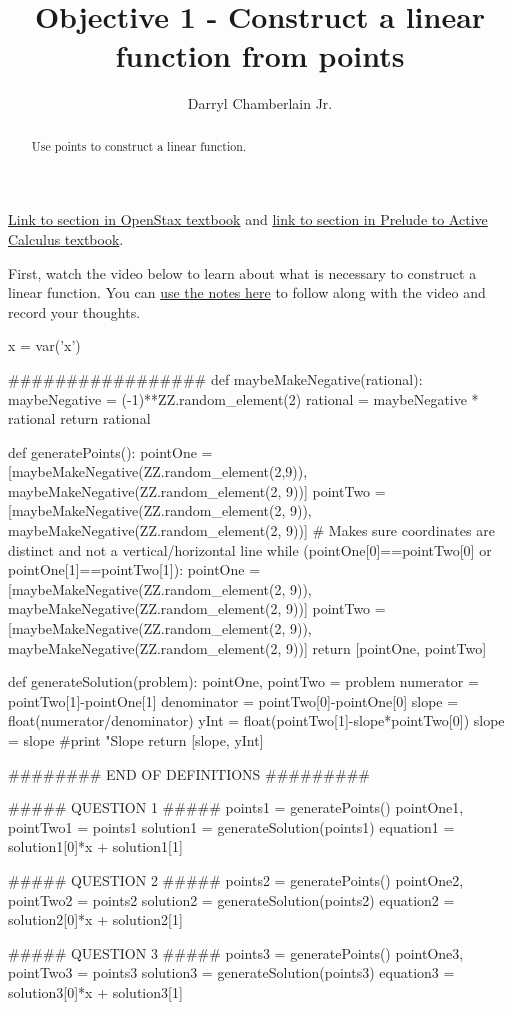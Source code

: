 \documentclass{ximera}
\author{Darryl Chamberlain Jr.}
\title{Objective 1 - Construct a linear function from points}
\begin{document}
\begin{abstract}
Use points to construct a linear function. 
\end{abstract}
\maketitle

\href{https://cnx.org/contents/mwjClAV_@8.1:62_eXnY6@14/Linear-Equations-in-One-Variable}{Link to section in OpenStax textbook} and 
\href{https://activecalculus.org/prelude/sec-changing-linear.html}{link to section in Prelude to Active Calculus textbook}. 


First, watch the video below to learn about what is necessary to construct a linear function. You can \href{http://people.clas.ufl.edu/dchamberlain31/files/Objective-1-Constructing-Linear-Functions.pdf}{use the notes here} to follow along with the video and record your thoughts.


\begin{sagesilent}
x = var('x')

#################
def maybeMakeNegative(rational):
    maybeNegative = (-1)**ZZ.random_element(2)
    rational = maybeNegative * rational
    return rational

def generatePoints():
    pointOne = [maybeMakeNegative(ZZ.random_element(2,9)), maybeMakeNegative(ZZ.random_element(2, 9))]
    pointTwo = [maybeMakeNegative(ZZ.random_element(2, 9)), maybeMakeNegative(ZZ.random_element(2, 9))]
    # Makes sure coordinates are distinct and not a vertical/horizontal line
    while (pointOne[0]==pointTwo[0] or pointOne[1]==pointTwo[1]):
        pointOne = [maybeMakeNegative(ZZ.random_element(2, 9)), maybeMakeNegative(ZZ.random_element(2, 9))]
        pointTwo = [maybeMakeNegative(ZZ.random_element(2, 9)), maybeMakeNegative(ZZ.random_element(2, 9))]
    return [pointOne, pointTwo]

def generateSolution(problem):
    pointOne, pointTwo = problem
    numerator = pointTwo[1]-pointOne[1]
    denominator = pointTwo[0]-pointOne[0]
    slope = float(numerator/denominator)
    yInt = float(pointTwo[1]-slope*pointTwo[0])
    slope = slope
    #print "Slope %
    return [slope, yInt]

######## END OF DEFINITIONS #########

##### QUESTION 1 #####
points1 = generatePoints()
pointOne1, pointTwo1 = points1
solution1 = generateSolution(points1)
equation1 = solution1[0]*x + solution1[1]

##### QUESTION 2 #####
points2 = generatePoints()
pointOne2, pointTwo2 = points2
solution2 = generateSolution(points2)
equation2 = solution2[0]*x + solution2[1]

##### QUESTION 3 #####
points3 = generatePoints()
pointOne3, pointTwo3 = points3
solution3 = generateSolution(points3)
equation3 = solution3[0]*x + solution3[1]
\end{sagesilent}
\end{document}
